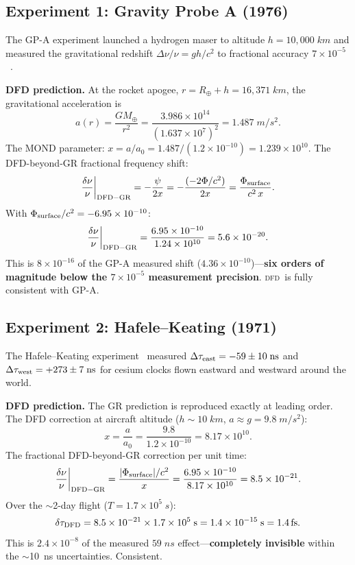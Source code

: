 \documentclass[aps,prd,twocolumn,superscriptaddress,nofootinbib,longbibliography]{revtex4-2}
\newcommand{\DFD}{\textsc{dfd}}
\newcommand{\fs}{\,\mathrm{fs}}
\begin{document}
\subsection{Experiment 1: Gravity Probe A (1976)}\label{sec:GPA}

The GP-A experiment launched a hydrogen maser to altitude $h = 10{,}000\;\si{km}$
and measured the gravitational redshift $\Delta\nu/\nu = gh/c^2$ to
fractional accuracy $7\times10^{-5}$~\cite{VessotLevine1979}.

\textbf{DFD prediction.} At the rocket apogee, $r = R_\oplus + h = 16{,}371\;\si{km}$,
the gravitational acceleration is
\begin{equation}
a(r) = \frac{GM_\oplus}{r^2} = \frac{3.986\times10^{14}}{(1.637\times10^7)^2}
= 1.487\;\si{m/s^2}.
\end{equation}
The MOND parameter: $x = a/a_0 = 1.487/(1.2\times10^{-10}) = 1.239\times10^{10}$.
The DFD-beyond-GR fractional frequency shift:
\begin{equation}
\frac{\delta\nu}{\nu}\bigg|_{\rm DFD-GR} = -\frac{\psi}{2x}
= -\frac{(-2\Phi/c^2)}{2x}
= \frac{\Phi_{\rm surface}}{c^2\,x}.
\end{equation}
With $\Phi_{\rm surface}/c^2 = -6.95\times10^{-10}$:
\begin{equation}
\frac{\delta\nu}{\nu}\bigg|_{\rm DFD-GR} = \frac{6.95\times10^{-10}}{1.24\times10^{10}}
= 5.6\times10^{-20}.
\end{equation}
This is $8\times10^{-16}$ of the GP-A measured shift
($4.36\times10^{-10}$)---\textbf{six orders of magnitude below the
$7\times10^{-5}$ measurement precision}. \DFD\ is fully consistent with GP-A.

\subsection{Experiment 2: Hafele--Keating (1971)}\label{sec:HK}

The Hafele--Keating experiment~\cite{HafeleKeating1972} measured
$\Delta\tau_{\rm east} = -59 \pm 10\;\si{ns}$ and
$\Delta\tau_{\rm west} = +273 \pm 7\;\si{ns}$ for cesium clocks
flown eastward and westward around the world.

\textbf{DFD prediction.} The GR prediction is reproduced exactly at leading
order. The DFD correction at aircraft altitude ($h \sim 10\;\si{km}$,
$a \approx g = 9.8\;\si{m/s^2}$):
\begin{equation}
x = \frac{a}{a_0} = \frac{9.8}{1.2\times10^{-10}} = 8.17\times10^{10}.
\end{equation}
The fractional DFD-beyond-GR correction per unit time:
\begin{equation}
\frac{\delta\nu}{\nu}\bigg|_{\rm DFD-GR} = \frac{|\Phi_{\rm surface}|/c^2}{x}
= \frac{6.95\times10^{-10}}{8.17\times10^{10}} = 8.5\times10^{-21}.
\end{equation}
Over the $\sim$2-day flight ($T = 1.7\times10^5\;\si{s}$):
\begin{equation}
\delta\tau_{\rm DFD} = 8.5\times10^{-21}\times 1.7\times10^5\;\si{s}
= 1.4\times10^{-15}\;\si{s} = 1.4\fs.
\end{equation}
This is $2.4\times10^{-8}$ of the measured $59\;\si{ns}$ effect---\textbf{completely
invisible} within the $\sim$10~ns uncertainties. Consistent.
\end{document}
